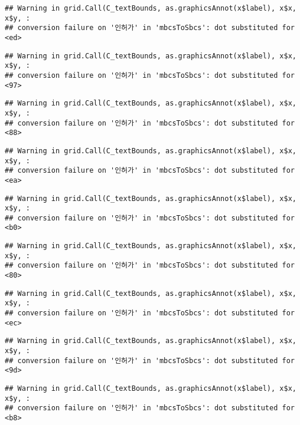\documentclass[
]{book}
\begin{document}
\begin{verbatim}
## Warning in grid.Call(C_textBounds, as.graphicsAnnot(x$label), x$x, x$y, :
## conversion failure on '인허가' in 'mbcsToSbcs': dot substituted for <ed>
\end{verbatim}

\begin{verbatim}
## Warning in grid.Call(C_textBounds, as.graphicsAnnot(x$label), x$x, x$y, :
## conversion failure on '인허가' in 'mbcsToSbcs': dot substituted for <97>
\end{verbatim}

\begin{verbatim}
## Warning in grid.Call(C_textBounds, as.graphicsAnnot(x$label), x$x, x$y, :
## conversion failure on '인허가' in 'mbcsToSbcs': dot substituted for <88>
\end{verbatim}

\begin{verbatim}
## Warning in grid.Call(C_textBounds, as.graphicsAnnot(x$label), x$x, x$y, :
## conversion failure on '인허가' in 'mbcsToSbcs': dot substituted for <ea>
\end{verbatim}

\begin{verbatim}
## Warning in grid.Call(C_textBounds, as.graphicsAnnot(x$label), x$x, x$y, :
## conversion failure on '인허가' in 'mbcsToSbcs': dot substituted for <b0>
\end{verbatim}

\begin{verbatim}
## Warning in grid.Call(C_textBounds, as.graphicsAnnot(x$label), x$x, x$y, :
## conversion failure on '인허가' in 'mbcsToSbcs': dot substituted for <80>
\end{verbatim}

\begin{verbatim}
## Warning in grid.Call(C_textBounds, as.graphicsAnnot(x$label), x$x, x$y, :
## conversion failure on '인허가' in 'mbcsToSbcs': dot substituted for <ec>
\end{verbatim}

\begin{verbatim}
## Warning in grid.Call(C_textBounds, as.graphicsAnnot(x$label), x$x, x$y, :
## conversion failure on '인허가' in 'mbcsToSbcs': dot substituted for <9d>
\end{verbatim}

\begin{verbatim}
## Warning in grid.Call(C_textBounds, as.graphicsAnnot(x$label), x$x, x$y, :
## conversion failure on '인허가' in 'mbcsToSbcs': dot substituted for <b8>
\end{verbatim}
\end{document}
